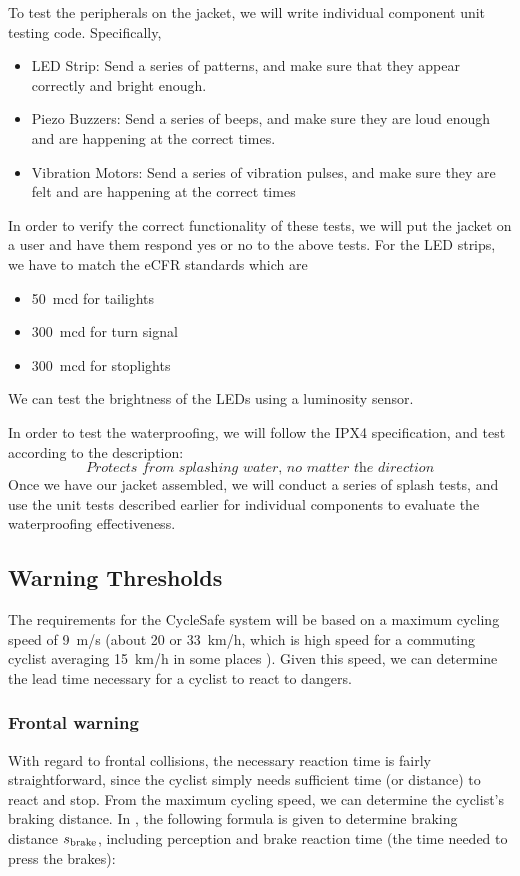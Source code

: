 \documentclass[journal]{IEEEtran}
\begin{document}
To test the peripherals on the jacket, we will write individual component unit testing code.
Specifically,
\begin{itemize}
    \item LED Strip: Send a series of patterns, and make sure that they appear correctly and bright enough.
    \item Piezo Buzzers: Send a series of beeps, and make sure they are loud enough and are happening at the correct times. 
    \item Vibration Motors: Send a series of vibration pulses, and make sure they are felt and are happening at the correct times
\end{itemize}
In order to verify the correct functionality of these tests, we will put the jacket on a user and have them respond yes or no to the above tests. For the LED strips, we have to match the eCFR standards\cite{light-brightness} which are
\begin{itemize}
    \item \SI{50}{\milli\candela} for tailights
    \item \SI{300}{\milli\candela} for turn signal
    \item \SI{300}{\milli\candela} for stoplights
\end{itemize}
We can test the brightness of the LEDs using a luminosity sensor.

In order to test the waterproofing, we will follow the IPX4 specification\cite{ipx-waterproofing}, and test according to the description:
\begin{equation}
    \textit{Protects from splashing water, no matter the direction}
\end{equation}
Once we have our jacket assembled, we will conduct a series of splash tests, and use the unit tests described earlier for individual components to evaluate the waterproofing effectiveness. 

\subsection{Warning Thresholds}
\label{specs:warning_thresholds}
The requirements for the CycleSafe system will be based on a maximum cycling speed of \SI{9}{\meter/\s} (about \SI{20}{\mph} or \SI{33}{\km/\hour}, which is high speed for a commuting cyclist averaging \SI{15}{\km/\hour} in some places \cite{cycling-speed}). Given this speed, we can determine the lead time necessary for a cyclist to react to dangers.

\subsubsection{Frontal warning}
With regard to frontal collisions, the necessary reaction time is fairly straightforward, since the cyclist simply needs sufficient time (or distance) to react and stop. From the maximum cycling speed, we can determine the cyclist's braking distance. In \cite{braking_distance}, the following formula is given to determine braking distance $s_\text{brake}$, including perception and brake reaction time (the time needed to press the brakes):
\end{document}

